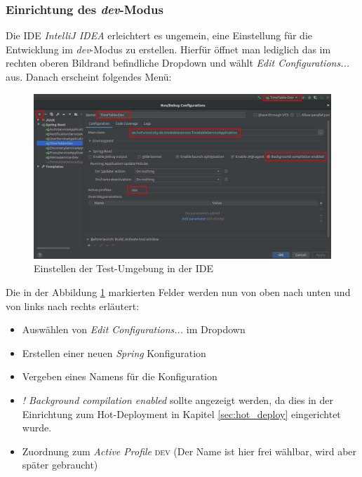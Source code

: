 \subsubsection*{Einrichtung des \textit{dev}-Modus}

Die \ac{IDE} \textit{IntelliJ IDEA} erleichtert es ungemein, eine Einstellung für die Entwicklung im \textit{dev}-Modus zu erstellen. Hierfür öffnet man lediglich das im rechten oberen Bildrand befindliche Dropdown und wählt \textit{Edit Configurations...} aus. Danach erscheint folgendes Menü:

\begin{figure}[H]
\centering
\includegraphics[width=\pictureWidth cm + 2 cm]{Bilder/Kapitel_5/ide_dev_config.png}
\caption{Einstellen der Test-Umgebung in der \ac{IDE}\label{fig:ide_dev_config}}
\end{figure}

Die in der Abbildung \ref{fig:ide_dev_config} markierten Felder werden nun von oben nach unten und von links nach rechts erläutert:

\begin{itemize}
\item Auswählen von \textit{Edit Configurations...} im Dropdown
\item Erstellen einer neuen \textit{Spring} Konfiguration
\item Vergeben eines Namens für die Konfiguration
\item \textit{! Background compilation enabled} sollte angezeigt werden, da dies in der Einrichtung zum Hot-Deployment in Kapitel \ref{sec:hot_deploy} eingerichtet wurde. 
\item Zuordnung zum \textit{Active Profile} \textsc{dev} (Der Name ist hier frei wählbar, wird aber später gebraucht)
\end{itemize}

